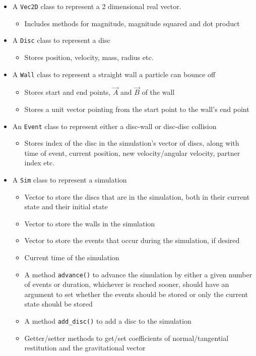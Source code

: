 \documentclass{article}
\begin{document}
\begin{itemize}
    \item A \texttt{Vec2D} class to represent a 2 dimensional real vector.
    \begin{itemize}
        \item Includes methods for magnitude, magnitude squared and dot product
    \end{itemize}
    \item A \texttt{Disc} class to represent a disc
    \begin{itemize}
        \item Stores position, velocity, mass, radius etc.
    \end{itemize}
    \item A \texttt{Wall} class to represent a straight wall a particle can bounce off
    \begin{itemize}
        \item Stores start and end points, $\vec{A}$ and $\vec{B}$ of the wall
        \item Stores a unit vector pointing from the start point to the wall's end point 
    \end{itemize}
    \item An \texttt{Event} class to represent either a disc-wall or disc-disc collision
    \begin{itemize}
        \item Stores index of the disc in the simulation's vector of discs, along with time of event, current position, new velocity/angular velocity, partner index etc.
    \end{itemize}
    \item A \texttt{Sim} class to represent a simulation
    \begin{itemize}
        \item Vector to store the discs that are in the simulation, both in their current state and their initial state
        \item Vector to store the walls in the simulation
        \item Vector to store the events that occur during the simulation, if desired
        \item Current time of the simulation
        \item A method \texttt{advance()} to advance the simulation by either a given number of events or duration, whichever is reached sooner, should have an argument to set whether the events should be stored or only the current state should be stored
        \item A method \texttt{add\_disc()} to add a disc to the simulation
        \item Getter/setter methods to get/set coefficients of normal/tangential restitution and the gravitational vector
    \end{itemize}
\end{itemize}
\end{document}
